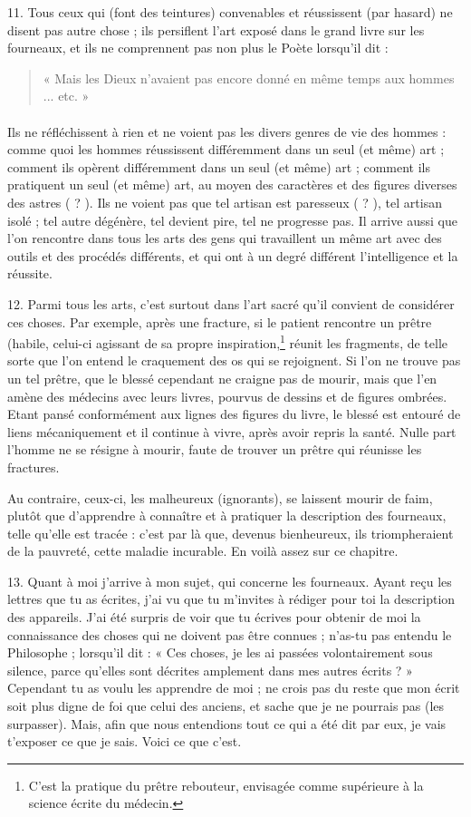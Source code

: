 \documentclass[a4paper, 11pt, oneside, polutonikogreek, french]{article}
\begin{document}
11. Tous ceux qui (font des teintures) convenables et réussissent (par hasard) ne disent pas autre chose ; ils persiflent l'art exposé dans le grand livre sur les fourneaux, et ils ne comprennent pas non plus le Poète lorsqu'il dit :
\begin{quotation}
« Mais les Dieux n'avaient pas encore donné en même temps aux hommes ... etc. »
\end{quotation}
\paragraph{}
Ils ne réfléchissent à rien et ne voient pas les divers genres de vie des hommes : comme quoi les hommes réussissent différemment dans un seul (et même) art ; comment ils opèrent différemment dans un seul (et même) art ; comment ils pratiquent un seul (et même) art, au moyen des caractères et des figures diverses des astres ( ? ). Ils ne voient pas que tel artisan est paresseux ( ? ), tel artisan isolé ; tel autre dégénère, tel devient pire, tel ne progresse pas. Il arrive aussi que l'on rencontre dans tous les arts des gens qui travaillent un même art avec des outils et des procédés différents, et qui ont à un degré différent l'intelligence et la réussite.

12. Parmi tous les arts, c'est surtout dans l'art sacré qu'il convient de considérer ces choses. Par exemple, après une fracture, si le patient rencontre un prêtre (habile, celui-ci agissant de sa propre inspiration,\footnote{C'est la pratique du prêtre rebouteur, envisagée comme supérieure à la science écrite du médecin.} réunit les fragments, de telle sorte que l'on entend le craquement des os qui se rejoignent. Si l'on ne trouve pas un tel prêtre, que le blessé cependant ne craigne pas de mourir, mais que l'en amène des médecins avec leurs livres, pourvus de dessins et de figures ombrées. Etant pansé conformément aux lignes des figures du livre, le blessé est entouré de liens mécaniquement et il continue à vivre, après avoir repris la santé. Nulle part l'homme ne se résigne à mourir, faute de trouver un prêtre qui réunisse les fractures.

Au contraire, ceux-ci, les malheureux (ignorants), se laissent mourir de faim, plutôt que d'apprendre à connaître et à pratiquer la description des fourneaux, telle qu'elle est tracée : c'est par là que, devenus bienheureux, ils triompheraient de la pauvreté, cette maladie incurable. En voilà assez sur ce chapitre.

13. Quant à moi j'arrive à mon sujet, qui concerne les fourneaux. Ayant reçu les lettres que tu as écrites, j'ai vu que tu m'invites à rédiger pour toi la description des appareils. J'ai été surpris de voir que tu écrives pour obtenir de moi la connaissance des choses qui ne doivent pas être connues ; n'as-tu pas entendu le Philosophe ; lorsqu'il dit : « Ces choses, je les ai passées volontairement sous silence, parce qu'elles sont décrites amplement dans mes autres écrits ? » Cependant tu as voulu les apprendre de moi ; ne crois pas du reste que mon écrit soit plus digne de foi que celui des anciens, et sache que je ne pourrais pas (les surpasser). Mais, afin que nous entendions tout ce qui a été dit par eux, je vais t'exposer ce que je sais. Voici ce que c'est.
\end{document}
